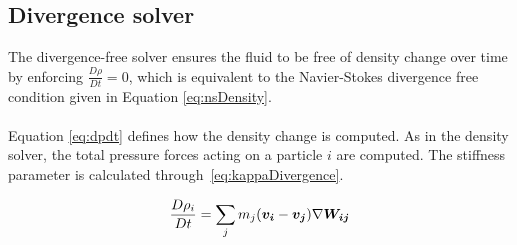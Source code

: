 

\subsection{Divergence solver} \label{divergenceSolver}

    The divergence-free solver ensures the fluid to be free of density change over time by enforcing $\frac{D\rho}{Dt} = 0$, which is equivalent to the Navier-Stokes divergence free condition given in Equation \ref{eq:nsDensity}. \\ \\ Equation \ref{eq:dpdt} defines how the density change is computed. As in the density solver, the total pressure forces acting on a particle $i$ are computed. The stiffness parameter is calculated through~\ref{eq:kappaDivergence}.

    \begin{equation} \label{eq:dpdt}
        \frac{D\rho_i}{Dt} = \sum_j m_j (\bm{v_i} - \bm{v_j})\nabla \bm{W_{ij}}
    \end{equation}

